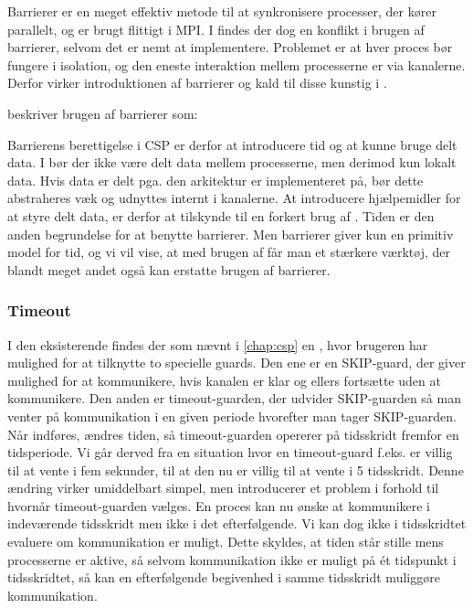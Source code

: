 Barrierer er en meget effektiv metode til at synkronisere processer, der kører 
parallelt, og er brugt flittigt i MPI. I \csp findes der dog en konflikt i brugen 
af barrierer, selvom det er nemt at implementere. Problemet er at hver proces bør fungere i isolation, og den eneste interaktion mellem processerne er via kanalerne. Derfor virker introduktionen af barrierer og kald til disse kunstig i \csp. 

\citeauthor{crew} beskriver brugen af barrierer som:
\begin{otherlanguage}{english}
\end{otherlanguage}
Barrierens berettigelse i CSP er derfor at  introducere tid og at kunne bruge delt data. I \csp bør der ikke være delt data mellem processerne, men derimod kun lokalt data. Hvis data er delt pga. den arkitektur \csp er implementeret på, bør dette abstraheres væk og udnyttes internt i kanalerne. At introducere hjælpemidler for at styre delt data, er derfor at tilskynde til en forkert brug af \csp. Tiden er den anden begrundelse for at benytte barrierer.
Men barrierer giver kun en  primitiv model for tid, og vi vil vise, at med brugen af \des får man et stærkere værktøj, der blandt meget andet også kan erstatte brugen af barrierer.

\subsubsection{Timeout} 
I den eksisterende \pycsp findes der som nævnt i \autoref{chap:csp} en , hvor brugeren har mulighed for at tilknytte to specielle guards. Den ene er en SKIP-guard, der giver mulighed for at kommunikere, hvis kanalen er klar og ellers fortsætte uden at kommunikere. Den anden er timeout-guarden, der udvider SKIP-guarden så man venter på kommunikation i en given periode hvorefter man tager SKIP-guarden. 
Når \des indføres, ændres tiden, så timeout-guarden opererer på tidsskridt fremfor en tidsperiode. Vi går derved fra en situation hvor en timeout-guard f.eks. er villig til at vente i fem sekunder, til at den nu er villig til at vente i 5 tidsskridt. Denne ændring virker umiddelbart simpel, men introducerer et problem i forhold til hvornår timeout-guarden vælges. En proces kan nu ønske at kommunikere i indeværende tidsskridt men ikke i det efterfølgende. Vi kan dog ikke i tidsskridtet evaluere om kommunikation er muligt. Dette skyldes, at tiden står stille mens processerne er aktive, så selvom kommunikation ikke er muligt på ét tidspunkt i tidsskridtet, så kan en efterfølgende begivenhed i samme tidsskridt muliggøre kommunikation.

